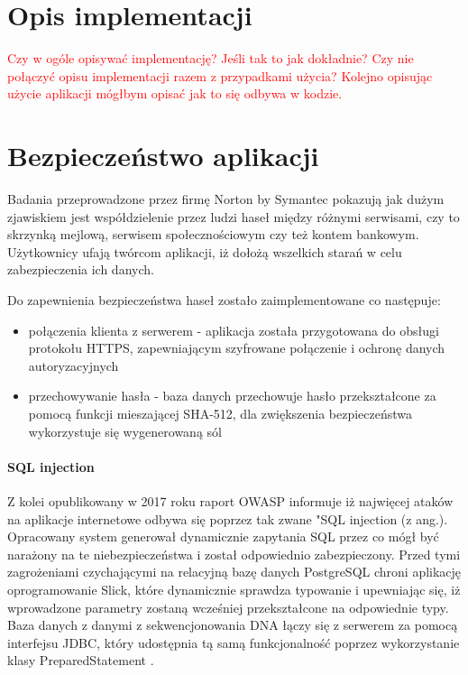 \documentclass[a4paper,12pt,twoside]{article}
\begin{document}
\newpage
\section{Opis implementacji}  
\textcolor{red}{
Czy w ogóle opisywać implementację? Jeśli tak to jak dokładnie? 
Czy nie połączyć opisu implementacji razem z przypadkami użycia?
Kolejno opisując użycie aplikacji mógłbym opisać jak to się odbywa w kodzie.
}

\newpage
\section{Bezpieczeństwo aplikacji}  
Badania przeprowadzone przez firmę Norton by Symantec \cite{nortonSec}
pokazują jak dużym zjawiskiem jest współdzielenie przez ludzi haseł między różnymi serwisami, czy to
skrzynką mejlową, serwisem społecznościowym czy też kontem bankowym.
Użytkownicy ufają twórcom aplikacji, iż dołożą wszelkich starań w celu zabezpieczenia ich 
danych. 

Do zapewnienia bezpieczeństwa haseł zostało zaimplementowane co następuje:
\begin{itemize}
\item{połączenia klienta z serwerem} - aplikacja została przygotowana do obsługi protokołu HTTPS,
zapewniającym szyfrowane połączenie i ochronę danych autoryzacyjnych
\item{przechowywanie hasła - baza danych przechowuje hasło przekształcone za pomocą funkcji mieszającej SHA-512, dla zwiększenia bezpieczeństwa wykorzystuje się wygenerowaną sól 
}
\end{itemize}

\paragraph{SQL injection} Z kolei opublikowany w 2017 roku raport OWASP \cite{owasp}
informuje iż najwięcej ataków na aplikacje internetowe odbywa się poprzez tak zwane "SQL injection (z ang.). 
Opracowany system generował dynamicznie zapytania SQL przez co mógł być narażony na te niebezpieczeństwa i został odpowiednio zabezpieczony.
Przed tymi zagrożeniami czychającymi na relacyjną bazę danych PostgreSQL chroni aplikację oprogramowanie Slick, które dynamicznie sprawdza typowanie i upewniając się, iż wprowadzone parametry
zostaną wcześniej przekształcone na odpowiednie typy.
Baza danych z danymi z sekwencjonowania DNA łączy się z serwerem za pomocą interfejsu JDBC,
który udostępnia tą samą funkcjonalność poprzez wykorzystanie klasy PreparedStatement \cite{preparedStatement}.
\end{document}
